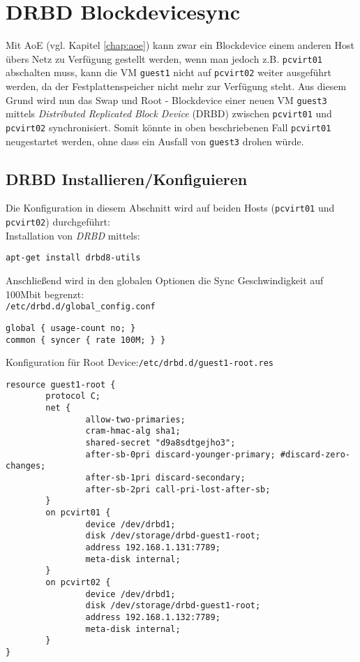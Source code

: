 \chapter{DRBD Blockdevicesync}

Mit AoE (vgl. Kapitel \ref{chap:aoe}) kann zwar ein Blockdevice einem anderen Host übers Netz zu Verfügung gestellt werden, wenn man jedoch z.B. \verb#pcvirt01# abschalten muss, kann die VM \verb#guest1# nicht auf \verb#pcvirt02# weiter ausgeführt werden, da der Festplattenspeicher nicht mehr zur Verfügung steht. Aus diesem Grund wird nun das Swap und Root - Blockdevice einer neuen VM \verb#guest3# mittels \emph{Distributed Replicated Block Device} (DRBD) zwischen \verb#pcvirt01# und \verb#pcvirt02# synchronisiert. Somit könnte in oben beschriebenen Fall \verb#pcvirt01# neugestartet werden, ohne dass ein Ausfall von \verb#guest3# drohen würde.

\section{DRBD Installieren/Konfiguieren}
Die Konfiguration in diesem Abschnitt wird auf beiden Hosts (\verb#pcvirt01# und \verb#pcvirt02#) durchgeführt: 
\\
Installation von \emph{DRBD} mittels: 
\setupVerbatimOut
\begin{verbatim}
apt-get install drbd8-utils
\end{verbatim}

Anschließend wird in den globalen Optionen die Sync Geschwindigkeit auf 100Mbit begrenzt:
\\
\verb|/etc/drbd.d/global_config.conf|
\setupVerbatimOut
\begin{verbatim}
global { usage-count no; }
common { syncer { rate 100M; } }
\end{verbatim}

Konfiguration für Root Device:\verb|/etc/drbd.d/guest1-root.res|
\setupVerbatimOut
\begin{verbatim}
resource guest1-root {
        protocol C;
        net {
                allow-two-primaries;
                cram-hmac-alg sha1;
                shared-secret "d9a8sdtgejho3";
                after-sb-0pri discard-younger-primary; #discard-zero-changes;
                after-sb-1pri discard-secondary;
                after-sb-2pri call-pri-lost-after-sb;
        }
        on pcvirt01 {
                device /dev/drbd1;
                disk /dev/storage/drbd-guest1-root;
                address 192.168.1.131:7789;
                meta-disk internal;
        }
        on pcvirt02 {
                device /dev/drbd1;
                disk /dev/storage/drbd-guest1-root;
                address 192.168.1.132:7789;
                meta-disk internal;
        }
}
\end{verbatim}

